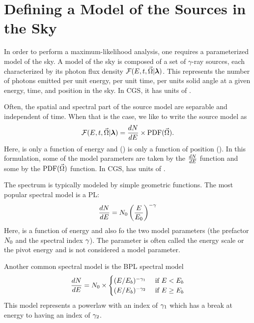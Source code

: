 \section{Defining a Model of the Sources in the Sky}


In order to perform a maximum-likelihood analysis, one requires
a parameterized model of the sky. A model of the sky
is composed of a set of $\gamma$-ray sources,
each characterized by its photon flux density 
  $\mathcal{F}(E,t,\vec\Omega|\boldsymbol{\lambda})$.
This represents
the number of photons emitted per unit energy, per unit
time, per units solid angle
at a given energy, time, and position in the sky.
In \ac{CGS}, it has units of \fluxdensityunits.

Often, the spatial and spectral part of the source model
are separable and independent of time. When that is the case,
we like to write the source model as
\begin{equation}
  \mathcal{F}(E,t,\vec\Omega|\boldsymbol{\lambda}) = \frac{dN}{dE} \times \text{PDF}(\vec\Omega).
\end{equation}
Here, \dnde is only a function of energy and \pdf(\solidangle) is only
a function of position (\solidangle).  In this formulation, some of the
model parameters \modelparams are taken by the $\frac{dN}{dE}$ function and some
by the $\text{PDF}(\vec\Omega)$ function.
In \ac{CGS}, \dnde has units of \prefunits.

The spectrum \dnde is typically modeled by simple geometric functions.
The most popular spectral model is a \ac{PL}:
\begin{equation}
  \frac{dN}{dE} = N_0 \left(\frac{E}{E_0}\right)^{-\gamma}
\end{equation}
Here, \dnde is a function of energy and also fo the two model parameters
(the prefactor $N_0$ and the spectral index $\gamma$). The
parameter \Escale is often called the energy scale or the pivot
energy and is not considered a model parameter.

Another common spectral model is the \ac{BPL} spectral model
\begin{equation}
  \frac{dN}{dE} = N_0 \times
    \begin{cases}
      (E/E_b)^{-\gamma_1} &\text{ if }E<E_b \\
      (E/E_b)^{-\gamma_2} &\text{ if }E\ge E_b
    \end{cases}
\end{equation}
This model represents a powerlaw with an index 
of $\gamma_1$ which has a break at energy \Ebreak
to having an index of $\gamma_2$.

